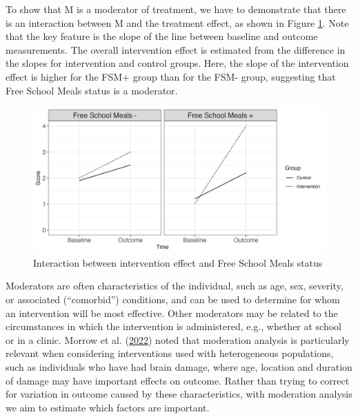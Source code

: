 \documentclass{krantz}
\begin{document}
To show that M is a moderator of treatment, we have to demonstrate that there is an interaction between M and the treatment effect, as shown in Figure \ref{fig:modfig}. Note that the key feature is the slope of the line between baseline and outcome measurements. The overall intervention effect is estimated from the difference in the slopes for intervention and control groups. Here, the slope of the intervention effect is higher for the FSM+ group than for the FSM- group, suggesting that Free School Meals status is a moderator.

\begin{center}
\begin{figure}
\includegraphics[width=0.95\linewidth]{images_bw/Moderator} \caption{Interaction between intervention effect and Free School Meals status}\label{fig:modfig}
\end{figure}
\end{center}

Moderators are often characteristics of the individual, such as age, sex, severity, or associated (``comorbid'') conditions, and can be used to determine for whom an intervention will be most effective. Other moderators may be related to the circumstances in which the intervention is administered, e.g., whether at school or in a clinic. Morrow et al. (\protect\hyperlink{ref-morrow2022}{2022}) noted that moderation analysis is particularly relevant when considering interventions used with heterogeneous populations, such as individuals who have had brain damage, where age, location and duration of damage may have important effects on outcome. Rather than trying to correct for variation in outcome caused by these characteristics, with moderation analysis we aim to estimate which factors are important.
\end{document}
